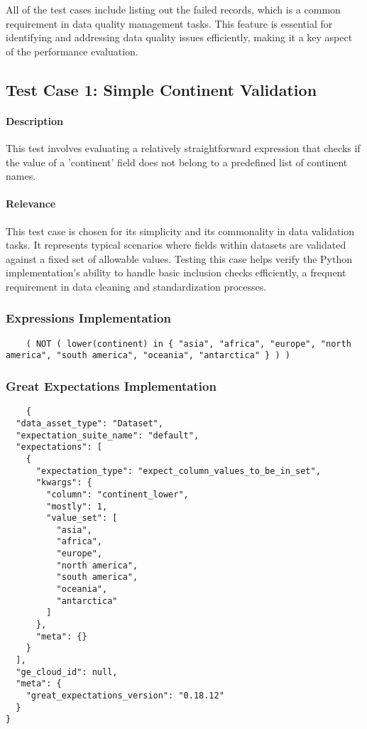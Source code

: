 All of the test cases include listing out the failed records, which is a common requirement in data quality management tasks. This feature is essential for identifying and addressing data quality issues efficiently, making it a key aspect of the performance evaluation.

\subsection{Test Case 1: Simple Continent Validation}

\paragraph{Description} This test involves evaluating a relatively straightforward expression that checks if the value of a 'continent' field does not belong to a predefined list of continent names. 

\paragraph{Relevance} This test case is chosen for its simplicity and its commonality in data validation tasks. It represents typical scenarios where fields within datasets are validated against a fixed set of allowable values. Testing this case helps verify the Python implementation’s ability to handle basic inclusion checks efficiently, a frequent requirement in data cleaning and standardization processes.

\subsubsection{Expressions Implementation}

\begin{verbatim}
    ( NOT ( lower(continent) in { "asia", "africa", "europe", "north america", "south america", "oceania", "antarctica" } ) )
\end{verbatim}

\subsubsection{Great Expectations Implementation}

\begin{verbatim}
    {
  "data_asset_type": "Dataset",
  "expectation_suite_name": "default",
  "expectations": [
    {
      "expectation_type": "expect_column_values_to_be_in_set",
      "kwargs": {
        "column": "continent_lower",
        "mostly": 1,
        "value_set": [
          "asia",
          "africa",
          "europe",
          "north america",
          "south america",
          "oceania",
          "antarctica"
        ]
      },
      "meta": {}
    }
  ],
  "ge_cloud_id": null,
  "meta": {
    "great_expectations_version": "0.18.12"
  }
}
\end{verbatim}

